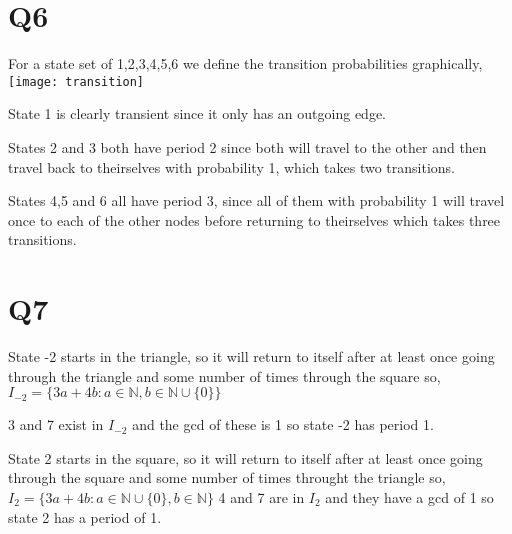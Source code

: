 \documentclass{article}
\begin{document}
\section*{Q6}
For a state set of {1,2,3,4,5,6} we define the transition probabilities graphically,
\texttt{[image: transition]}

State 1 is clearly transient since it only has an outgoing edge. 

States 2 and 3 both have period 2 since both will travel to the other and then travel back to theirselves with probability 1, which takes two transitions.

States 4,5 and 6 all have period 3, since all of them with probability 1 will travel once to each of the other nodes before returning to theirselves which takes three transitions.

\section*{Q7}
State -2 starts in the triangle, so it will return to itself after at least once going through the triangle and some number of times through the square so,
$I_{-2} = \{3a + 4b : a \in \mathbb{N} , b \in \mathbb{N} \cup \{0\} \}$

3 and 7 exist in $I_{-2}$ and the gcd of these is 1 so state -2 has period 1.

State 2 starts in the square, so it will return to itself after at least once going through the square and some number of times throught the triangle so, 
$I_{2} = \{3a + 4b : a \in \mathbb{N} \cup \{0\} , b \in \mathbb{N}\}$
4 and 7 are in $I_2$ and they have a gcd of 1 so state 2 has a period of 1.
\end{document}
